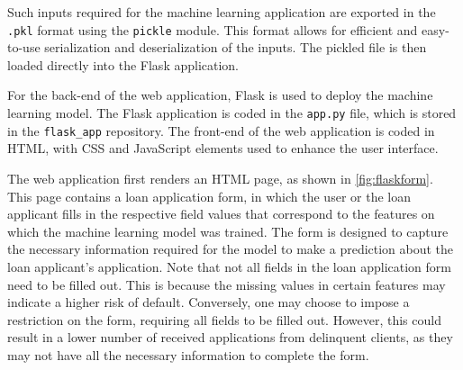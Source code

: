 Such inputs required for the machine learning application are exported in the \lstinline{.pkl} format using the \lstinline{pickle} module. This format allows for efficient and easy-to-use serialization and deserialization of the inputs. The pickled file is then loaded directly into the Flask application.

For the back-end of the web application, Flask is used to deploy the machine learning model. The Flask application is coded in the \lstinline{app.py} file, which is stored in the \lstinline{flask_app} repository. The front-end of the web application is coded in HTML, with CSS and JavaScript elements used to enhance the user interface.

The web application first renders an HTML page, as shown in \autoref{fig:flaskform}.
This page contains a loan application form, in which the user or the loan applicant fills in the respective field values that correspond to the features on which the machine learning model was trained.
The form is designed to capture the necessary information required for the model to make a prediction about the loan applicant's application.
Note that not all fields in the loan application form need to be filled out. This is because the missing values in certain features may indicate a higher risk of default. Conversely, one may choose to impose a restriction on the form, requiring all fields to be filled out. However, this could result in a lower number of received applications from delinquent clients, as they may not have all the necessary information to complete the form.
